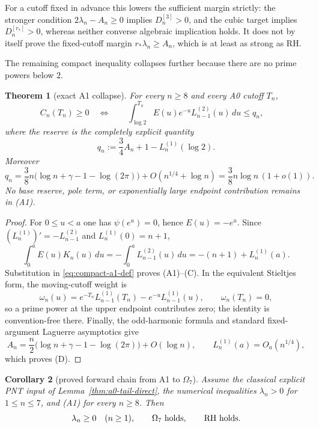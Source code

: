 \documentclass[11pt]{amsart}
\newtheorem{theorem}{Theorem}[section]
\newtheorem{corollary}[theorem]{Corollary}
\theoremstyle{definition}
\theoremstyle{remark}
\theoremstyle{definition}
\begin{document}
For a cutoff fixed in advance this lowers the sufficient margin strictly: the stronger condition
$2\lambda_n-A_n\ge0$ implies $D_n^{[3]}>0$, and the cubic target implies
$D_n^{[r_*]}>0$, whereas neither converse algebraic implication holds.  It
does not by itself prove the fixed-cutoff margin $r_*\lambda_n\ge A_n$, which is at least as strong as RH.

The remaining compact inequality collapses further because there are no prime powers below $2$.

\begin{theorem}[exact A1 collapse]\label{thm:a1-direct-collapse}
For every $n\ge8$ and every A0 cutoff $T_n$,
\[
 C_n(T_n)\ge0
 \quad\Longleftrightarrow\quad
 \boxed{\quad
 \int_{\log2}^{T_n}\!E(u)e^{-u}L_{n-1}^{(2)}(u)\,du
 \le q_n,
 \quad}                                                     \tag{A1}
\]
where the reserve is the completely explicit quantity
\[
 q_n:=\frac34A_n+1-L_n^{(1)}(\log2).                         \tag{C}
\]
Moreover
\[
 q_n=\frac38n\bigl(\log n+\gamma-1-\log(2\pi)\bigr)
       +O(n^{1/4}+\log n)
     =\frac38n\log n\,(1+o(1)).                             \tag{D}
\]
No base reserve, pole term, or exponentially large endpoint contribution remains in (A1).
\end{theorem}

\begin{proof}
For $0\le u<a$ one has $\psi(e^u)=0$, hence $E(u)=-e^u$.  Since
$(L_n^{(1)})'=-L_{n-1}^{(2)}$ and $L_n^{(1)}(0)=n+1$,
\[
 \int_0^aE(u)K_n(u)\,du
 =-\int_0^aL_{n-1}^{(2)}(u)\,du
 =-(n+1)+L_n^{(1)}(a).
\]
Substitution in \eqref{eq:compact-a1-def} proves (A1)--(C).  In the equivalent
Stieltjes form, the moving-cutoff weight is
\[
 \omega_n(u)=e^{-T_n}L_{n-1}^{(1)}(T_n)-e^{-u}L_{n-1}^{(1)}(u),
 \qquad \omega_n(T_n)=0,
\]
so a prime power at the upper endpoint contributes zero; the identity is convention-free there.
Finally, the odd-harmonic formula and standard fixed-argument Laguerre asymptotics give
\[
 A_n=\frac n2\bigl(\log n+\gamma-1-\log(2\pi)\bigr)+O(\log n),
 \qquad L_n^{(1)}(a)=O_a(n^{1/4}),
\]
which proves (D).
\end{proof}

\begin{corollary}[proved forward chain from A1 to $\Omega_7$]\label{cor:a1-to-omega7}
Assume the classical explicit PNT input of Lemma~\ref{thm:a0-tail-direct}, the numerical
inequalities $\lambda_n>0$ for $1\le n\le7$, and (A1) for every $n\ge8$.
Then
\[
 \lambda_n\ge0\quad(n\ge1),\qquad \Omega_7\ \text{holds},\qquad \textnormal{RH}\ \text{holds}.
\]
\end{corollary}
\end{document}
